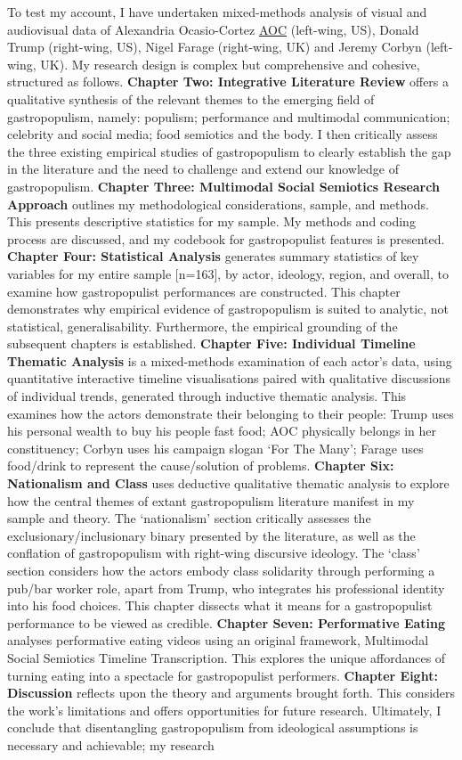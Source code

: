 \documentclass[a4paper, nobind]{templates/ociamthesis}
\begin{document}
To test my account, I have undertaken mixed-methods analysis of visual and audiovisual data of Alexandria Ocasio-Cortez \protect\hyperlink{aoc}{AOC} (left-wing, US), Donald Trump (right-wing, US), Nigel Farage (right-wing, UK) and Jeremy Corbyn (left-wing, UK). My research design is complex but comprehensive and cohesive, structured as follows. \textbf{Chapter Two: Integrative Literature Review} offers a qualitative synthesis of the relevant themes to the emerging field of gastropopulism, namely: populism; performance and multimodal communication; celebrity and social media; food semiotics and the body. I then critically assess the three existing empirical studies of gastropopulism to clearly establish the gap in the literature and the need to challenge and extend our knowledge of gastropopulism. \textbf{Chapter Three: Multimodal Social Semiotics Research Approach} outlines my methodological considerations, sample, and methods. This presents descriptive statistics for my sample. My methods and coding process are discussed, and my codebook for gastropopulist features is presented. \textbf{Chapter Four: Statistical Analysis} generates summary statistics of key variables for my entire sample {[}n=163{]}, by actor, ideology, region, and overall, to examine how gastropopulist performances are constructed. This chapter demonstrates why empirical evidence of gastropopulism is suited to analytic, not statistical, generalisability. Furthermore, the empirical grounding of the subsequent chapters is established. \textbf{Chapter Five: Individual Timeline Thematic Analysis} is a mixed-methods examination of each actor's data, using quantitative interactive timeline visualisations paired with qualitative discussions of individual trends, generated through inductive thematic analysis. This examines how the actors demonstrate their belonging to their people: Trump uses his personal wealth to buy his people fast food; AOC physically belongs in her constituency; Corbyn uses his campaign slogan `For The Many'; Farage uses food/drink to represent the cause/solution of problems. \textbf{Chapter Six: Nationalism and Class} uses deductive qualitative thematic analysis to explore how the central themes of extant gastropopulism literature manifest in my sample and theory. The `nationalism' section critically assesses the exclusionary/inclusionary binary presented by the literature, as well as the conflation of gastropopulism with right-wing discursive ideology. The `class' section considers how the actors embody class solidarity through performing a pub/bar worker role, apart from Trump, who integrates his professional identity into his food choices. This chapter dissects what it means for a gastropopulist performance to be viewed as credible. \textbf{Chapter Seven: Performative Eating} analyses performative eating videos using an original framework, Multimodal Social Semiotics Timeline Transcription. This explores the unique affordances of turning eating into a spectacle for gastropopulist performers. \textbf{Chapter Eight: Discussion} reflects upon the theory and arguments brought forth. This considers the work's limitations and offers opportunities for future research. Ultimately, I conclude that disentangling gastropopulism from ideological assumptions is necessary and achievable; my research 
\end{document}
